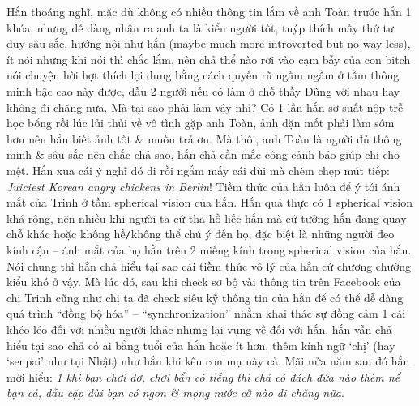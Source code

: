 \documentclass[12pt,oneside]{book}
\begin{document}
Hắn thoáng nghĩ, mặc dù không có nhiều thông tin lắm về anh Toàn trước hắn 1 khóa, nhưng dễ dàng nhận ra anh ta là kiểu người tốt, tuýp thích mấy thứ tư duy sâu sắc, hướng nội như hắn (maybe much more introverted but no way less), ít nói nhưng khi nói thì chắc lắm, nên chả thể nào rơi vào cạm bẫy của con bitch nói chuyện hời hợt thích lợi dụng bằng cách quyến rũ ngấm ngầm ở tầm thông minh bậc cao này được, dẫu 2 người nếu có làm ở chỗ thầy {\sf Dũng} với nhau hay không đi chăng nữa. Mà tại sao phải làm vậy nhỉ? Có 1 lần hắn sơ suất nộp trễ học bổng rồi lúc lủi thủi về vô tình gặp anh Toàn, ảnh dặn mốt phải làm sớm hơn nên hắn biết ảnh tốt \& muốn trả ơn. Mà thôi, anh Toàn là người đủ thông minh \& sâu sắc nên chắc chả sao, hắn chả cần mắc công cảnh báo giúp chi cho mệt. Hắn xua cái ý nghĩ đó đi rồi ngắm mấy cái đùi mà chèm chẹp mút tiếp: {\it Juiciest Korean angry chickens in Berlin}! Tiềm thức của hắn luôn để ý tới ánh mắt của Trinh ở tầm spherical vision của hắn. Hắn quả thực có 1 spherical vision khá rộng, nên nhiều khi người ta cứ tha hồ liếc hắn mà cứ tưởng hắn đang quay chỗ khác hoặc không hề{\tt/}không thể chú ý đến họ, đặc biệt là những người đeo kính cận -- ánh mắt của họ hằn trên 2 miếng kính trong spherical vision của hắn. Nói chung thì hắn chả hiểu tại sao cái tiềm thức vô lý của hắn cứ chương chướng kiểu khó ở vậy. Mà lúc đó, sau khi check sơ bộ vài thông tin trên Facebook của chị Trinh cũng như chị ta đã check siêu kỹ thông tin của hắn để có thể dễ dàng quá trình ``đồng bộ hóa'' -- ``synchronization'' nhằm khai thác sự đồng cảm 1 cái khéo léo đối với nhiều người khác nhưng lại vụng về đối với hắn, hắn vẫn chả hiểu tại sao chả có ai bằng tuổi của hắn hoặc ít hơn, thêm kính ngữ `chị' (hay `senpai' như tụi Nhật) như hắn khi kêu con mụ này cả. Mãi nửa năm sau đó hắn mới hiểu: {\it 1 khi bạn chơi dơ, chơi bẩn có tiếng thì chả có đách đứa nào thèm nể bạn cả, dẫu cặp đùi bạn có ngon \& mọng nước cỡ nào đi chăng nữa}.
\end{document}
